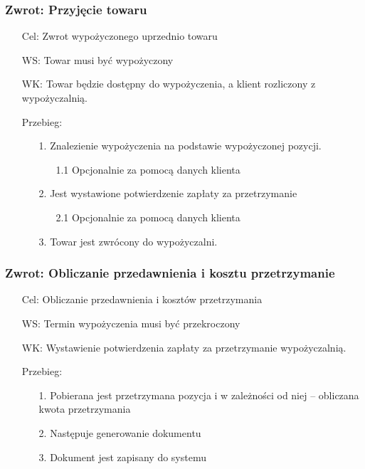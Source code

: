 \documentclass{article}
\begin{document}
\subsubsection{Zwrot: Przyjęcie towaru}
\begin{enumerate}
\item[Cel:] Zwrot wypożyczonego uprzednio towaru
	\item[WS:] Towar musi być wypożyczony
	\item[WK:]  Towar będzie dostępny do wypożyczenia, a klient rozliczony z wypożyczalnią.
	\item[Przebieg:]
	\begin{enumerate}
		\item [1.]Znalezienie wypożyczenia na podstawie wypożyczonej pozycji.
		\begin{enumerate}
			\item [1.1] Opcjonalnie za pomocą danych klienta 
		\end{enumerate}
		\item [2.]Jest wystawione potwierdzenie zapłaty za przetrzymanie
			\begin{enumerate}
			\item [2.1] Opcjonalnie za pomocą danych klienta 
		\end{enumerate}
		\item [3.]Towar jest zwrócony do wypożyczalni.
	\end{enumerate}
\end{enumerate}

\subsubsection{Zwrot: Obliczanie przedawnienia i kosztu przetrzymanie}
\begin{enumerate}
	\item[Cel:] Obliczanie przedawnienia i kosztów przetrzymania
	\item[WS:] Termin wypożyczenia musi być przekroczony
	\item[WK:]  Wystawienie potwierdzenia zapłaty za przetrzymanie wypożyczalnią.
	\item[Przebieg:]
	\begin{enumerate}
		\item [1.]Pobierana jest przetrzymana pozycja i w zależności od niej – obliczana kwota przetrzymania
		\item [2.]Następuje generowanie dokumentu
		\item [3.] Dokument jest zapisany do systemu
	\end{enumerate}
\end{enumerate}
	
\end{document}
